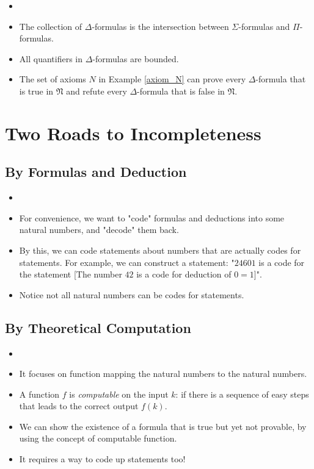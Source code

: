 \documentclass[11pt,letterpaper]{book}
\theoremstyle{definition}
\begin{document}
\begin{itemize}
\item[]
\item{The collection of $\Delta$-formulas is the intersection between
$\Sigma$-formulas and $\Pi$-formulas.}
\item{All quantifiers in $\Delta$-formulas are bounded.}
\item{The set of axioms $N$ in Example \ref{axiom_N} can prove every
$\Delta$-formula that is true in $\mathfrak{N}$ and refute every
$\Delta$-formula that is false in $\mathfrak{N}$.}

\end{itemize}


\section{Two Roads to Incompleteness}

\subsection{By Formulas and Deduction}

\begin{itemize}

\item[]
\item{For convenience, we want to "code" formulas and deductions into some natural
numbers, and "decode" them back.}
\item{By this, we can code statements about numbers that are actually
codes for statements. For example, we can construct a statement: "$24601$ is a code for the statement
[The number $42$ is a code for deduction of $0=1$]".}
\item{Notice not all natural numbers can be codes for statements.}

\end{itemize}


\subsection{By Theoretical Computation}

\begin{itemize}
\item[]
\item{It focuses on function mapping the natural numbers to the natural
numbers. }
\item{A function $f$ is \emph{computable} on the input $k$: if there is
a sequence of easy steps that leads to the correct output $f(k)$.}
\item{We can show the existence of a formula that is true but yet
not provable, by using the concept of computable function.}
\item{It requires a way to code up statements too!}
\end{itemize}
\end{document}
